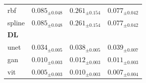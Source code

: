 \begin{table}[htbp]
{\begin{tabular}{lccc}
rbf & $0.085_{\pm 0.048}$ & $0.261_{\pm 0.154}$ & $0.077_{\pm 0.042}$ \\
spline & $0.085_{\pm 0.048}$ & $0.261_{\pm 0.154}$ & $0.077_{\pm 0.042}$ \\
\midrule
\multicolumn{4}{l}{\textbf{DL}} \\
unet & $0.034_{\pm 0.005}$ & $0.038_{\pm 0.005}$ & $0.039_{\pm 0.007}$ \\
gan & $0.010_{\pm 0.003}$ & $0.012_{\pm 0.003}$ & $0.011_{\pm 0.003}$ \\
vit & $0.005_{\pm 0.003}$ & $0.010_{\pm 0.003}$ & $0.007_{\pm 0.004}$ \\
\bottomrule
\end{tabular}
}
\end{table}
